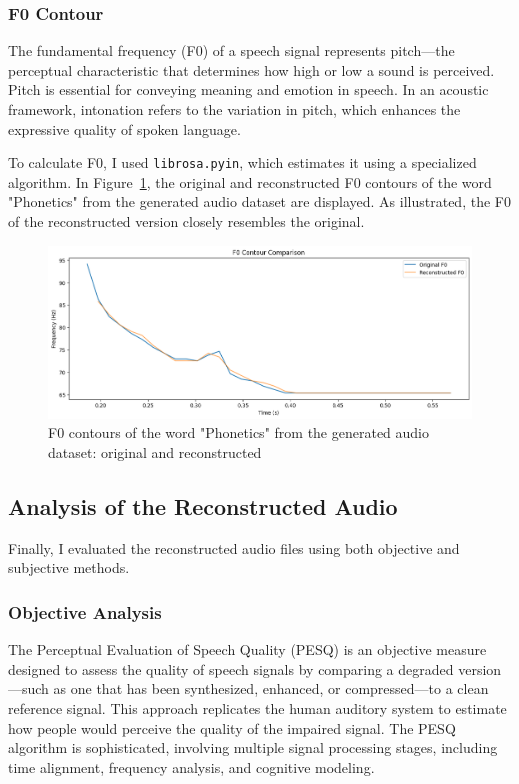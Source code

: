 \documentclass[12pt]{article}
\begin{document}
\subsubsection{F0 Contour}
The fundamental frequency (F0) of a speech signal represents pitch—the perceptual characteristic that determines how high or low a sound is perceived. Pitch is essential for conveying meaning and emotion in speech. In an acoustic framework, intonation refers to the variation in pitch, which enhances the expressive quality of spoken language.

To calculate F0, I used \texttt{librosa.pyin}, which estimates it using a specialized algorithm. In Figure~\ref{fig:f0_phonetics}, the original and reconstructed F0 contours of the word "Phonetics" from the generated audio dataset are displayed. As illustrated, the F0 of the reconstructed version closely resembles the original.

\begin{figure}[h]
    \centering
    \includegraphics[width=\linewidth]{f0_phonetics.png}
    \caption{F0 contours of the word "Phonetics" from the generated audio dataset: original and reconstructed}
    \label{fig:f0_phonetics}
\end{figure}


\subsection{Analysis of the Reconstructed Audio}

Finally, I evaluated the reconstructed audio files using both objective and subjective methods.

\subsubsection{Objective Analysis}

The Perceptual Evaluation of Speech Quality (PESQ) is an objective measure designed to assess the quality of speech signals by comparing a degraded version—such as one that has been synthesized, enhanced, or compressed—to a clean reference signal. This approach replicates the human auditory system to estimate how people would perceive the quality of the impaired signal. The PESQ algorithm is sophisticated, involving multiple signal processing stages, including time alignment, frequency analysis, and cognitive modeling.
\end{document}
